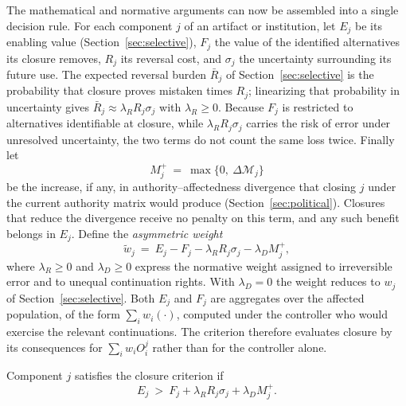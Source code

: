 The mathematical and normative arguments can now be assembled into a single decision rule. For each component $j$ of an artifact or institution, let $E_j$ be its enabling value (Section~\ref{sec:selective}), $F_j$ the value of the identified alternatives its closure removes, $R_j$ its reversal cost, and $\sigma_j$ the uncertainty surrounding its future use. The expected reversal burden $\bar R_j$ of Section~\ref{sec:selective} is the probability that closure proves mistaken times $R_j$; linearizing that probability in uncertainty gives $\bar R_j\approx\lambda_RR_j\sigma_j$ with $\lambda_R\geq 0$. Because $F_j$ is restricted to alternatives identifiable at closure, while $\lambda_RR_j\sigma_j$ carries the risk of error under unresolved uncertainty, the two terms do not count the same loss twice. Finally let
\[
M_j^+\ =\ \max\{0,\ \Delta\mathcal{M}_j\}
\]
be the increase, if any, in authority--affectedness divergence that closing $j$ under the current authority matrix would produce (Section~\ref{sec:political}). Closures that reduce the divergence receive no penalty on this term, and any such benefit belongs in $E_j$. Define the \emph{asymmetric weight}
\begin{equation}\label{eq:asym-weight}
\tilde w_j\ =\ E_j-F_j-\lambda_RR_j\sigma_j-\lambda_DM_j^+,
\end{equation}
where $\lambda_R\geq 0$ and $\lambda_D\geq 0$ express the normative weight assigned to irreversible error and to unequal continuation rights. With $\lambda_D=0$ the weight reduces to $w_j$ of Section~\ref{sec:selective}. Both $E_j$ and $F_j$ are aggregates over the affected population, of the form $\sum_iw_i(\cdot)$, computed under the controller who would exercise the relevant continuations. The criterion therefore evaluates closure by its consequences for $\sum_iw_iO_i^j$ rather than for the controller alone.

\begin{definition}
Component $j$ satisfies the closure criterion if
\begin{equation}\label{eq:closure-criterion}
E_j\ >\ F_j+\lambda_RR_j\sigma_j+\lambda_DM_j^+ .
\end{equation}
\end{definition}

